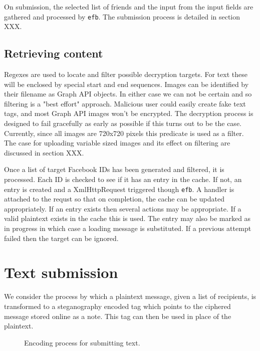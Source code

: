 On submission, the selected list of friends and the input from the input fields are gathered and processed by {\tt efb}. The submission process is detailed in section XXX.


\subsection{Retrieving content}

Regexes are used to locate and filter possible decryption targets. For text these will be enclosed by special start and end sequences. Images can be identified by their filename as Graph API objects. In either case we can not be certain and so filtering is a "best effort" approach. Malicious user could easily create fake text tags, and most Graph API images won't be encrypted. The decryption process is designed to fail gracefully as early as possible if this turns out to be the case. Currently, since all images are 720x720 pixels this predicate is used as a filter. The case for uploading variable sized images and its effect on filtering are discussed in section XXX.

Once a list of target Facebook IDs has been generated and filtered, it is processed. Each ID is checked to see if it has an entry in the cache. If not, an entry is created and a XmlHttpRequest triggered though {\tt efb}. A handler is attached to the requst so that on completion, the cache can be updated appropriately. If an entry exists then several actions may be appropriate. If a valid plaintext exists in the cache this is used. The entry may also be marked as in progress in which case a loading message is substituted. If a previous attempt failed then the target can be ignored.


    
\FloatBarrier
\section{Text submission}

We consider the process by which a plaintext message, given a list of recipients, is transformed to a steganography encoded tag which points to the ciphered message stored online as a note. This tag can then be used in place of the plaintext.

    \begin{figure}[tb]
        \begin{center}
                
            \caption{Encoding process for submitting text.}
            \label{tikz:text}
        \end{center}
    \end{figure}



